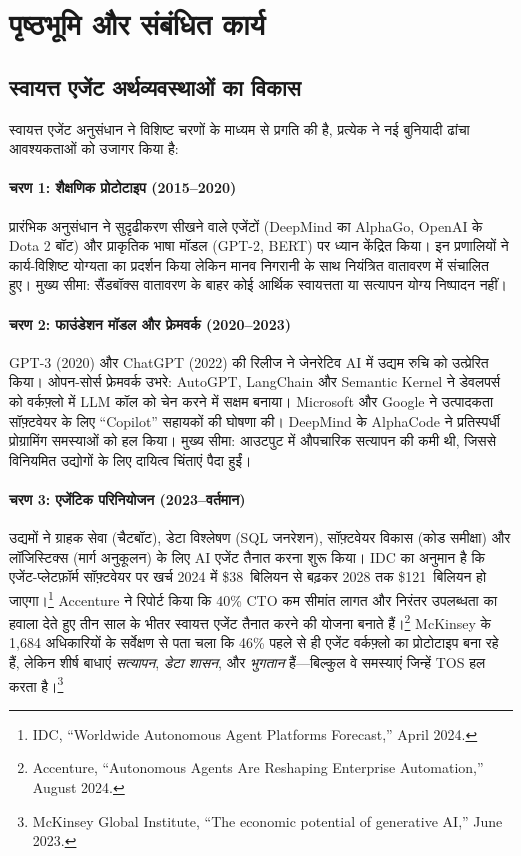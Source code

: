 \documentclass[11pt]{article}
\begin{document}
\section{पृष्ठभूमि और संबंधित कार्य}
\subsection{स्वायत्त एजेंट अर्थव्यवस्थाओं का विकास}
स्वायत्त एजेंट अनुसंधान ने विशिष्ट चरणों के माध्यम से प्रगति की है, प्रत्येक ने नई बुनियादी ढांचा आवश्यकताओं को उजागर किया है:

\paragraph{चरण 1: शैक्षणिक प्रोटोटाइप (2015--2020)} प्रारंभिक अनुसंधान ने सुदृढीकरण सीखने वाले एजेंटों (DeepMind का AlphaGo, OpenAI के Dota 2 बॉट) और प्राकृतिक भाषा मॉडल (GPT-2, BERT) पर ध्यान केंद्रित किया। इन प्रणालियों ने कार्य-विशिष्ट योग्यता का प्रदर्शन किया लेकिन मानव निगरानी के साथ नियंत्रित वातावरण में संचालित हुए। मुख्य सीमा: सैंडबॉक्स वातावरण के बाहर कोई आर्थिक स्वायत्तता या सत्यापन योग्य निष्पादन नहीं।

\paragraph{चरण 2: फाउंडेशन मॉडल और फ्रेमवर्क (2020--2023)} GPT-3 (2020) और ChatGPT (2022) की रिलीज ने जेनरेटिव AI में उद्यम रुचि को उत्प्रेरित किया। ओपन-सोर्स फ्रेमवर्क उभरे: AutoGPT, LangChain और Semantic Kernel ने डेवलपर्स को वर्कफ़्लो में LLM कॉल को चेन करने में सक्षम बनाया। Microsoft और Google ने उत्पादकता सॉफ़्टवेयर के लिए ``Copilot'' सहायकों की घोषणा की। DeepMind के AlphaCode ने प्रतिस्पर्धी प्रोग्रामिंग समस्याओं को हल किया। मुख्य सीमा: आउटपुट में औपचारिक सत्यापन की कमी थी, जिससे विनियमित उद्योगों के लिए दायित्व चिंताएं पैदा हुईं।

\paragraph{चरण 3: एजेंटिक परिनियोजन (2023--वर्तमान)} उद्यमों ने ग्राहक सेवा (चैटबॉट), डेटा विश्लेषण (SQL जनरेशन), सॉफ़्टवेयर विकास (कोड समीक्षा) और लॉजिस्टिक्स (मार्ग अनुकूलन) के लिए AI एजेंट तैनात करना शुरू किया। IDC का अनुमान है कि एजेंट-प्लेटफ़ॉर्म सॉफ़्टवेयर पर खर्च 2024 में \$38~बिलियन से बढ़कर 2028 तक \$121~बिलियन हो जाएगा।\footnote{IDC, ``Worldwide Autonomous Agent Platforms Forecast,'' April 2024.} Accenture ने रिपोर्ट किया कि 40\% CTO कम सीमांत लागत और निरंतर उपलब्धता का हवाला देते हुए तीन साल के भीतर स्वायत्त एजेंट तैनात करने की योजना बनाते हैं।\footnote{Accenture, ``Autonomous Agents Are Reshaping Enterprise Automation,'' August 2024.} McKinsey के 1,684 अधिकारियों के सर्वेक्षण से पता चला कि 46\% पहले से ही एजेंट वर्कफ़्लो का प्रोटोटाइप बना रहे हैं, लेकिन शीर्ष बाधाएं \emph{सत्यापन}, \emph{डेटा शासन}, और \emph{भुगतान} हैं---बिल्कुल वे समस्याएं जिन्हें TOS हल करता है।\footnote{McKinsey Global Institute, ``The economic potential of generative AI,'' June 2023.}
\end{document}
